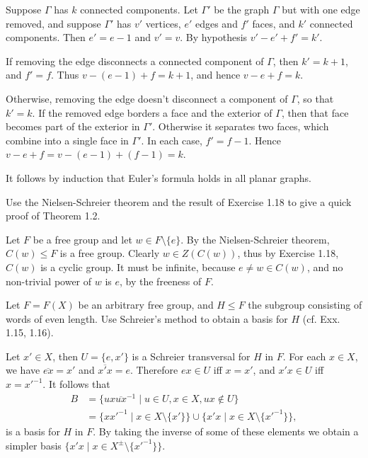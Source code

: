 \begin{questions}
\begin{solution}
    Suppose $\Gamma$ has $k$ connected components. Let $\Gamma'$ be the graph $\Gamma$ but with one edge removed, and suppose $\Gamma'$ has $v'$ vertices, $e'$ edges and $f'$ faces, and $k'$ connected components. Then $e'=e-1$ and $v'=v$. By hypothesis $v'-e'+f'=k'$.

    If removing the edge disconnects a connected component of $\Gamma$, then $k'=k+1$, and $f'=f$. Thus $v-(e-1)+f=k+1$, and hence $v-e+f=k$.

    Otherwise, removing the edge doesn't disconnect a component of $\Gamma$, so that $k'=k$. If the removed edge borders a face and the exterior of $\Gamma$, then that face becomes part of the exterior in $\Gamma'$. Otherwise it separates two faces, which combine into a single face in $\Gamma'$. In each case, $f'=f-1$. Hence $v-e+f=v-(e-1)+(f-1)=k$.

    It follows by induction that Euler's formula holds in all planar graphs.
  \end{solution}

\question Use the Nielsen-Schreier theorem and the result of Exercise 1.18 to give a quick proof of Theorem 1.2.
  \begin{solution}
    Let $F$ be a free group and let $w\in F\setminus\{e\}$. By the Nielsen-Schreier theorem, $C(w)\leq F$ is a free group. Clearly $w\in Z(C(w))$, thus by Exercise 1.18, $C(w)$ is a cyclic group. It must be infinite, because $e\neq w\in C(w)$, and no non-trivial power of $w$ is $e$, by the freeness of $F$.
  \end{solution}

\question Let $F=F(X)$ be an arbitrary free group, and $H\leq F$ the subgroup consisting of words of even length. Use Schreier's method to obtain a basis for $H$ (cf. Exx. 1.15, 1.16).
  \begin{solution}
    Let $x'\in X$, then $U=\{e,x'\}$ is a Schreier transversal for $H$ in $F$. For each $x\in X$, we have $\overline{ex}=x'$ and $\overline{x'x}=e$. Therefore $ex\in U$ iff $x=x'$, and $x'x\in U$ iff $x=x'^{-1}$. It follows that
    \begin{align*}
      B &= \{ ux\overline{ux}^{-1} \mid u\in U, x\in X, ux\notin U \} \\
        &= \{ xx'^{-1} \mid x\in X\setminus\{x'\} \} \cup \{ x'x \mid x\in X\setminus\{x'^{-1}\} \},
    \end{align*}
    is a basis for $H$ in $F$. By taking the inverse of some of these elements we obtain a simpler basis $\{x'x \mid x\in X^\pm\setminus\{x'^{-1}\}\}$.
  \end{solution}


\end{questions}
